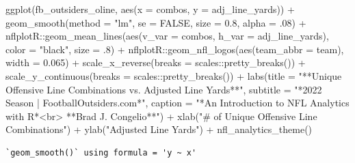 \documentclass[
  letterpaper,
]{krantz}
\newenvironment{Shaded}{\begin{snugshade}}{\end{snugshade}}
\newcommand{\AttributeTok}[1]{\textcolor[rgb]{0.40,0.45,0.13}{#1}}
\newcommand{\ConstantTok}[1]{\textcolor[rgb]{0.56,0.35,0.01}{#1}}
\newcommand{\DecValTok}[1]{\textcolor[rgb]{0.68,0.00,0.00}{#1}}
\newcommand{\FloatTok}[1]{\textcolor[rgb]{0.68,0.00,0.00}{#1}}
\newcommand{\FunctionTok}[1]{\textcolor[rgb]{0.28,0.35,0.67}{#1}}
\newcommand{\NormalTok}[1]{\textcolor[rgb]{0.00,0.23,0.31}{#1}}
\newcommand{\SpecialCharTok}[1]{\textcolor[rgb]{0.37,0.37,0.37}{#1}}
\newcommand{\StringTok}[1]{\textcolor[rgb]{0.13,0.47,0.30}{#1}}
\begin{document}
\begin{Shaded}
\begin{Highlighting}[]
\FunctionTok{ggplot}\NormalTok{(fb\_outsiders\_oline, }\FunctionTok{aes}\NormalTok{(}\AttributeTok{x =}\NormalTok{ combos, }\AttributeTok{y =}\NormalTok{ adj\_line\_yards)) }\SpecialCharTok{+}
  \FunctionTok{geom\_smooth}\NormalTok{(}\AttributeTok{method =} \StringTok{"lm"}\NormalTok{, }\AttributeTok{se =} \ConstantTok{FALSE}\NormalTok{, }\AttributeTok{size =} \FloatTok{0.8}\NormalTok{, }\AttributeTok{alpha =}\NormalTok{ .}\DecValTok{08}\NormalTok{) }\SpecialCharTok{+}
\NormalTok{  nflplotR}\SpecialCharTok{::}\FunctionTok{geom\_mean\_lines}\NormalTok{(}\FunctionTok{aes}\NormalTok{(}\AttributeTok{v\_var =}\NormalTok{ combos, }\AttributeTok{h\_var =}\NormalTok{ adj\_line\_yards),}
                            \AttributeTok{color =} \StringTok{"black"}\NormalTok{, }\AttributeTok{size =}\NormalTok{ .}\DecValTok{8}\NormalTok{) }\SpecialCharTok{+}
\NormalTok{  nflplotR}\SpecialCharTok{::}\FunctionTok{geom\_nfl\_logos}\NormalTok{(}\FunctionTok{aes}\NormalTok{(}\AttributeTok{team\_abbr =}\NormalTok{ team), }\AttributeTok{width =} \FloatTok{0.065}\NormalTok{) }\SpecialCharTok{+}
  \FunctionTok{scale\_x\_reverse}\NormalTok{(}\AttributeTok{breaks =}\NormalTok{ scales}\SpecialCharTok{::}\FunctionTok{pretty\_breaks}\NormalTok{()) }\SpecialCharTok{+}
  \FunctionTok{scale\_y\_continuous}\NormalTok{(}\AttributeTok{breaks =}\NormalTok{ scales}\SpecialCharTok{::}\FunctionTok{pretty\_breaks}\NormalTok{()) }\SpecialCharTok{+}
  \FunctionTok{labs}\NormalTok{(}\AttributeTok{title =} \StringTok{"**Unique Offensive Line Combinations vs.}
\StringTok{       Adjusted Line Yards**"}\NormalTok{,}
       \AttributeTok{subtitle =} \StringTok{"*2022 Season  |  FootballOutsiders.com*"}\NormalTok{,}
       \AttributeTok{caption =} \StringTok{"*An Introduction to NFL Analytics with R*\textless{}br\textgreater{}}
\StringTok{       **Brad J. Congelio**"}\NormalTok{) }\SpecialCharTok{+}
  \FunctionTok{xlab}\NormalTok{(}\StringTok{"\# of Unique Offensive Line Combinations"}\NormalTok{) }\SpecialCharTok{+}
  \FunctionTok{ylab}\NormalTok{(}\StringTok{"Adjusted Line Yards"}\NormalTok{) }\SpecialCharTok{+}
  \FunctionTok{nfl\_analytics\_theme}\NormalTok{()}
\end{Highlighting}
\end{Shaded}

\begin{verbatim}
`geom_smooth()` using formula = 'y ~ x'
\end{verbatim}
\end{document}
